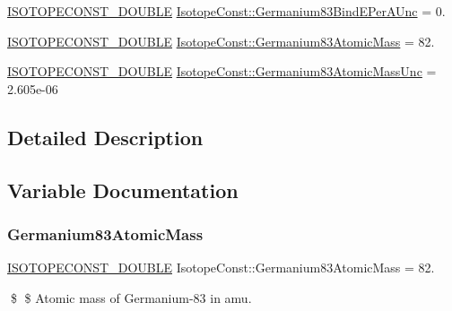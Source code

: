 \begin{DoxyCompactItemize}
\mbox{\hyperlink{group___isotope_const-_macros_ga8f45a7272ce02c0b4c65c44636ed719a}{I\+S\+O\+T\+O\+P\+E\+C\+O\+N\+S\+T\+\_\+\+D\+O\+U\+B\+LE}} \mbox{\hyperlink{group___isotope_const-_germanium-_ge83_ga8b15bbe9a18a2fa27ad520da3089dd59}{Isotope\+Const\+::\+Germanium83\+Bind\+E\+Per\+A\+Unc}} = 0.
\item 
\mbox{\hyperlink{group___isotope_const-_macros_ga8f45a7272ce02c0b4c65c44636ed719a}{I\+S\+O\+T\+O\+P\+E\+C\+O\+N\+S\+T\+\_\+\+D\+O\+U\+B\+LE}} \mbox{\hyperlink{group___isotope_const-_germanium-_ge83_ga1fe1b4affb3237270a7cf64aa04357a5}{Isotope\+Const\+::\+Germanium83\+Atomic\+Mass}} = 82.
\item 
\mbox{\hyperlink{group___isotope_const-_macros_ga8f45a7272ce02c0b4c65c44636ed719a}{I\+S\+O\+T\+O\+P\+E\+C\+O\+N\+S\+T\+\_\+\+D\+O\+U\+B\+LE}} \mbox{\hyperlink{group___isotope_const-_germanium-_ge83_ga3d6878ce60546bd3116a89690d4e6d38}{Isotope\+Const\+::\+Germanium83\+Atomic\+Mass\+Unc}} = 2.\+605e-\/06
\end{DoxyCompactItemize}


\subsection{Detailed Description}


\subsection{Variable Documentation}
\mbox{\label{group___isotope_const-_germanium-_ge83_ga1fe1b4affb3237270a7cf64aa04357a5}} 
\subsubsection{\texorpdfstring{Germanium83\+Atomic\+Mass}{Germanium83AtomicMass}}
{\footnotesize\ttfamily \mbox{\hyperlink{group___isotope_const-_macros_ga8f45a7272ce02c0b4c65c44636ed719a}{I\+S\+O\+T\+O\+P\+E\+C\+O\+N\+S\+T\+\_\+\+D\+O\+U\+B\+LE}} Isotope\+Const\+::\+Germanium83\+Atomic\+Mass = 82.}

\$ \$ Atomic mass of Germanium-\/83 in amu. \mbox{\label{group___isotope_const-_germanium-_ge83_ga3d6878ce60546bd3116a89690d4e6d38}} 
